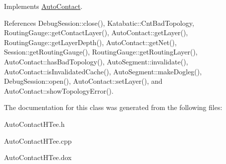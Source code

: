  

Implements \hyperlink{classKatabatic_1_1AutoContact_a690764ddc997fe9766a79c4b8e0c3e2f}{Auto\+Contact}.



References Debug\+Session\+::close(), Katabatic\+::\+Cnt\+Bad\+Topology, Routing\+Gauge\+::get\+Contact\+Layer(), Auto\+Contact\+::get\+Layer(), Routing\+Gauge\+::get\+Layer\+Depth(), Auto\+Contact\+::get\+Net(), Session\+::get\+Routing\+Gauge(), Routing\+Gauge\+::get\+Routing\+Layer(), Auto\+Contact\+::has\+Bad\+Topology(), Auto\+Segment\+::invalidate(), Auto\+Contact\+::is\+Invalidated\+Cache(), Auto\+Segment\+::make\+Dogleg(), Debug\+Session\+::open(), Auto\+Contact\+::set\+Layer(), and Auto\+Contact\+::show\+Topology\+Error().



The documentation for this class was generated from the following files\+:\begin{DoxyCompactItemize}
\item 
Auto\+Contact\+H\+Tee.\+h\item 
Auto\+Contact\+H\+Tee.\+cpp\item 
Auto\+Contact\+H\+Tee.\+dox\end{DoxyCompactItemize}
